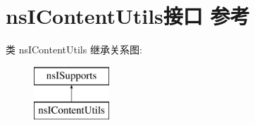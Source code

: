 \hypertarget{interfacens_i_content_utils}{}\section{ns\+I\+Content\+Utils接口 参考}
\label{interfacens_i_content_utils}
类 ns\+I\+Content\+Utils 继承关系图\+:\begin{figure}[H]
\begin{center}
\leavevmode
\includegraphics[height=2.000000cm]{interfacens_i_content_utils}
\end{center}
\end{figure}
